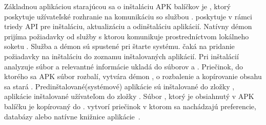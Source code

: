 \noindent Základnou aplikáciou starajúcou sa o inštaláciu APK balíčkov je , ktorý poskytuje užívateľské rozhranie na komunikáciu so službou .   poskytuje v rámci triedy  API pre inštaláciu, aktualizáciu a odinštaláciu aplikácií. Natívny démon  prijíma požiadavky od služby  s ktorou komunikuje prostredníctvom lokálneho soketu . Služba  a démon  sú spustené pri štarte systému.  čaká na pridanie požiadavky na inštaláciu do zoznamu inštalovaných aplikácií. Pri inštalácií analyzuje súbor  a relevantné informácie ukladá do súborov  a . Priečinok, do ktorého sa APK súbor rozbalí, vytvára démon , o rozbalenie a kopírovanie obsahu sa stará . Predinštalované(systémové) aplikácie sú inštalované do zložky , aplikácie inštalované užívateľom do zložky . Súbor , ktorý je obsiahnutý v APK balíčku je kopírovaný do .  vytvorí priečinok  v ktorom sa nachádzajú preferencie, databázy alebo natívne knižnice aplikácie~\cite{Parmar2013}.